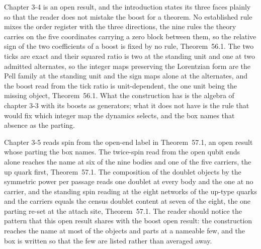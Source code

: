 Chapter 3-4 is an open result, and the introduction states its three faces plainly so that the reader does not mistake the boost for a theorem. No established rule mixes the order register with the three directions, the nine rules the theory carries on the five coordinates carrying a zero block between them, so the relative sign of the two coefficients of a boost is fixed by no rule, Theorem~56.1. The two ticks are exact and their squared ratio is two at the standing unit and one at two admitted alternates, so the integer maps preserving the Lorentzian form are the Pell family at the standing unit and the sign maps alone at the alternates, and the boost read from the tick ratio is unit-dependent, the one unit being the missing object, Theorem~56.1. What the construction has is the algebra of chapter 3-3 with its boosts as generators; what it does not have is the rule that would fix which integer map the dynamics selects, and the box names that absence as the parting.

Chapter 3-5 reads spin from the open-end label in Theorem~57.1, an open result whose parting the box names. The twice-spin read from the open qubit ends alone reaches the name at six of the nine bodies and one of the five carriers, the up quark first, Theorem~57.1. The composition of the doublet objects by the symmetric power per passage reads one doublet at every body and the one at no carrier, and the standing spin reading at the eight networks of the up-type quarks and the carriers equals the census doublet content at seven of the eight, the one parting re-set at the attach site, Theorem~57.1. The reader should notice the pattern that this open result shares with the boost open result: the construction reaches the name at most of the objects and parts at a nameable few, and the box is written so that the few are listed rather than averaged away.

